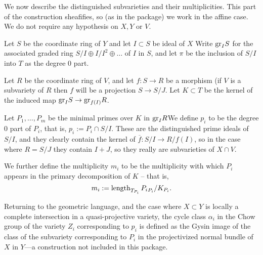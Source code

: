 \documentclass[twoside,12pt, leqno]{amsart}
\def\gr{{\rm gr}}
\begin{document}
We now describe the distinguished subvarieties and their multiplicities. This part of the construction sheafifies, so (as in the package) we work in the affine case. We do not require any hypothesis on $X, Y$ or $V$. 

Let $S$ be the coordinate ring of $Y$ and let $I\subset S$ be  ideal of $X$
Write
$
\gr_{I}S
$ for the associated graded ring $S/I\oplus I/I^{2}\oplus\dots$ of $I$ in $S$, and let
$\pi$ be the inclusion of $S/I$ into $T$ as the degree 0 part.

Let $R$ be the coordinate ring of $V$, and let $f:S\to R$ be a morphism (if $V$ is a subvariety of $R$ then $f$ will be a projection  $S\to S/J$. Let $K\subset T$ be the kernel of the induced map $ \gr_{I}S \to \gr_{f(I)}R$.  

Let $P_{1},\dots, P_{m}$ be the minimal primes over $K$ in $\gr_{I}R$We define $p_{i}$ to be the degree 0 part of $P_{i}$, that is, $p_{i} := P_{i}\cap S/I$. These are the distinguished prime ideals of $S/I$, and they clearly contain the kernel of $\overline f: S/I \to R/f(I)$, so in the case where $R = S/J$ they contain $I+J$, so they really are subvarieties
of $X\cap V$.

We further define the multiplicity $m_{i}$ to be the multiplicity with which $P_{i}$ appears in the primary decomposition of $K$ -- that is,
$$
m_{i} := \operatorname{length}_{T_{P_{i}}}{P_{i}}_{P_{i}}/K_{P_{i}}.
$$

Returning to the geometric language, and the case where $X\subset Y$ is locally a complete intersection in a quasi-projective variety, the cycle class $\alpha_{i}$ in the Chow group of the variety 
$Z_{i}$ corresponding to $p_{i}$ is defined as the Gysin image of the class of the subvariety corresponding
to $P_{i}$ in the projectivized normal bundle of $X$ in $Y$---a construction not included in this package. 
\end{document}

